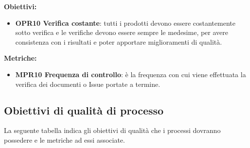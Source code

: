 \documentclass[../piano_di_qualifica.tex]{subfiles}
\begin{document}
\textbf{Obiettivi:}
\smallbreak
\begin{itemize}
	\item \textbf{OPR10 Verifica costante}: tutti i prodotti devono essere costantemente sotto verifica e le verifiche devono essere sempre le medesime, per avere consistenza con i risultati e poter apportare miglioramenti di qualità.
\end{itemize}

\textbf{Metriche:}
\smallbreak
\begin{itemize}
	\item \textbf{MPR10 Frequenza di controllo}: è la frequenza con cui viene effettuata la verifica dei documenti o Issue portate a termine.
\end{itemize}

\subsection{Obiettivi di qualità di processo}
La seguente tabella indica gli obiettivi di qualità che i processi dovranno possedere e le metriche ad essi associate.\\
\end{document}
